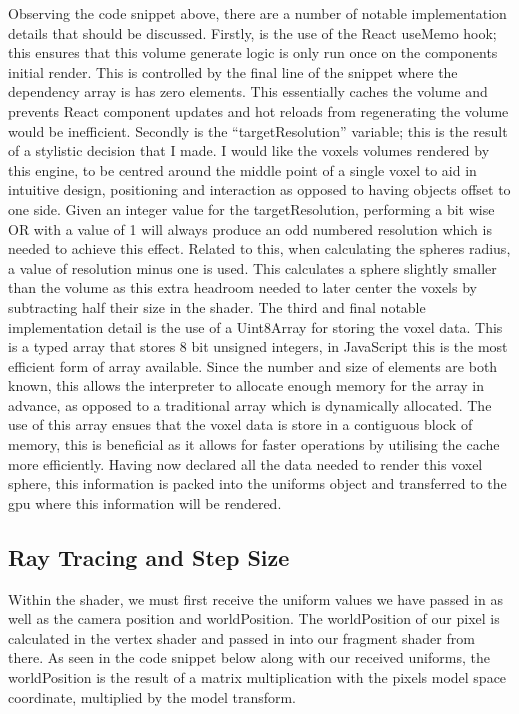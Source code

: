 \documentclass[titlepage]{article}
\begin{document}


Observing the code snippet above, there are a number of notable implementation details that should be discussed. Firstly, is the use of the React useMemo hook; this ensures that this volume generate logic is only run once on the components initial render. This is controlled by the final line of the snippet where the dependency array is has zero elements. This essentially caches the volume and prevents React component updates and hot reloads from regenerating the volume would be inefficient. Secondly is the ``targetResolution'' variable; this is the result of a stylistic decision that I made. I would like the voxels volumes rendered by this engine, to be centred around the middle point of a single voxel to aid in intuitive design, positioning and interaction as opposed to having objects offset to one side. Given an integer value for the targetResolution, performing a bit wise OR with a value of 1 will always produce an odd numbered resolution which is needed to achieve this effect. Related to this, when calculating the spheres radius, a value of resolution minus one is used. This calculates a sphere slightly smaller than the volume as this extra headroom needed to later center the voxels by subtracting half their size in the shader. The third and final notable implementation detail is the use of a Uint8Array for storing the voxel data. This is a typed array that stores 8 bit unsigned integers, in JavaScript this is the most efficient form of array available. Since the number and size of elements are both known, this allows the interpreter to allocate enough memory for the array in advance, as opposed to a traditional array which is dynamically allocated. The use of this array ensues that the voxel data is store in a contiguous block of memory, this is beneficial as it allows for faster operations by utilising the cache more efficiently. Having now declared all the data needed to render this voxel sphere, this information is packed into the uniforms object and transferred to the \gls{gpu} where this information will be rendered.

\subsection{Ray Tracing and Step Size}

Within the shader, we must first receive the uniform values we have passed in as well as the camera position and worldPosition. The worldPosition of our pixel is calculated in the vertex shader and passed in into our fragment shader from there. As seen in the code snippet below along with our received uniforms, the worldPosition is the result of a matrix multiplication with the pixels model space coordinate, multiplied by the model transform.
\end{document}
